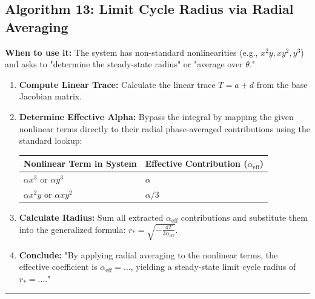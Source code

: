 \documentclass[11pt, a4paper]{report}
\begin{document}
\subsection*{Algorithm 13: Limit Cycle Radius via Radial Averaging}
\textbf{When to use it:} The system has non-standard nonlinearities (e.g., $x^2y, xy^2, y^3$) and asks to "determine the steady-state radius" or "average over $\theta$."
\begin{enumerate}[label=\textbf{\arabic*.}]
    \item \textbf{Compute Linear Trace:} Calculate the linear trace $T = a + d$ from the base Jacobian matrix.
    \item \textbf{Determine Effective Alpha:} Bypass the integral by mapping the given nonlinear terms directly to their radial phase-averaged contributions using the standard lookup: 
    \begin{center}
    \begin{tabular}{|l|l|}
    \hline
    \textbf{Nonlinear Term in System} & \textbf{Effective Contribution ($\alpha_{\text{eff}}$)} \\ \hline
    $\alpha x^3$ or $\alpha y^3$ & $\alpha$ \\ \hline
    $\alpha x^2 y$ or $\alpha x y^2$ & $\alpha/3$ \\ \hline
    \end{tabular}
    \end{center}
    \item \textbf{Calculate Radius:} Sum all extracted $\alpha_{\text{eff}}$ contributions and substitute them into the generalized formula: $r_* = \sqrt{-\frac{4T}{3\alpha_{\text{eff}}}}$.
    \item \textbf{Conclude:} "By applying radial averaging to the nonlinear terms, the effective coefficient is $\alpha_{\text{eff}} = \dots$, yielding a steady-state limit cycle radius of $r_* = \dots$."
\end{enumerate}
\vspace{1em}
\noindent\rule{\textwidth}{0.4pt}
\vspace{1em}
\end{document}
